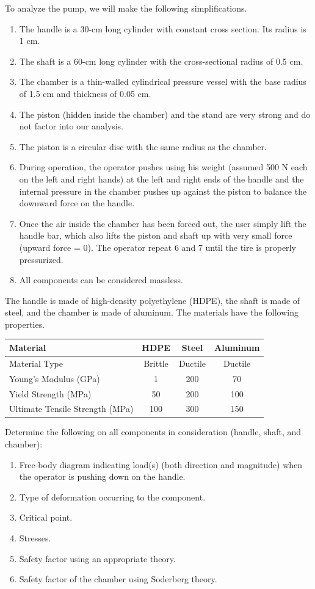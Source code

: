 \documentclass[
10pt,
a4paper,
openany,
svgnames,
]{book}
\begin{document}
To analyze the pump, we will make the following simplifications.
\begin{enumerate}
\item The handle is a 30-cm long cylinder with constant cross section. Its radius is 1 cm.
\item The shaft is a 60-cm long cylinder with the cross-sectional radius of 0.5 cm.
\item The chamber is a thin-walled cylindrical pressure vessel with the base radius of 1.5 cm and thickness of 0.05 cm.
\item The piston (hidden inside the chamber) and the stand are very strong and do not factor into our analysis.
\item The piston is a circular disc with the same radius as the chamber.
\item During operation, the operator pushes using his weight (assumed 500 N each on the left and right hands) at the left and right ends of the handle and the internal pressure in the chamber pushes up against the piston to balance the downward force on the handle.
\item Once the air inside the chamber has been forced out, the user simply lift the handle bar, which also lifts the piston and shaft up with very small force (upward force = 0). The operator repeat 6 and 7 until the tire is properly pressurized.
\item All components can be considered massless.
\end{enumerate}
The handle is made of high-density polyethylene (HDPE), the shaft is made of steel, and the chamber is made of aluminum. The materials have the following properties.
\begin{table}[h]
  \centering
    \begin{tabular}{ lccc }
      \toprule
      Material & HDPE & Steel & Aluminum \\
      \midrule
      Material Type & Brittle & Ductile & Ductile \\
      Young’s Modulus (GPa) & 1 & 200 & 70 \\
      Yield Strength (MPa) & 50 & 200 & 100 \\
      Ultimate Tensile Strength (MPa) & 100 & 300 & 150 \\
      \bottomrule
  \end{tabular}
\end{table}

Determine the following on all components in consideration (handle, shaft, and chamber):
\begin{enumerate}
\item Free-body diagram indicating load(s) (both direction and magnitude) when the operator is pushing down on the handle.
\item Type of deformation occurring to the component.
\item Critical point.
\item Stresses.
\item Safety factor using an appropriate theory.
\item Safety factor of the chamber using Soderberg theory.
\end{enumerate}
\end{document}

